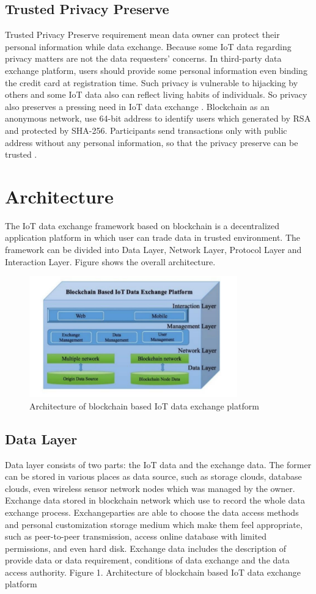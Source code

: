 \section{Trusted Privacy Preserve}
Trusted Privacy Preserve requirement mean data owner
can protect their personal information while data exchange.
Because some IoT data regarding privacy matters are not the
data requesters’ concerns.
In third-party data exchange platform, users should
provide some personal information even binding the credit
card at registration time. Such privacy is vulnerable to
hijacking by others and some IoT data also can reflect living
habits of individuals. So privacy also preserves a pressing
need in IoT data exchange .
Blockchain as an anonymous network, use 64-bit address
to identify users which generated by RSA and protected by
SHA-256. Participants send transactions only with public
address without any personal information, so that the privacy
preserve can be trusted .


\chapter{ Architecture}

The IoT data exchange framework based on blockchain
is a decentralized application platform in which user can
trade data in trusted environment. The framework can be
divided into Data Layer, Network Layer, Protocol Layer and
Interaction Layer. Figure shows the overall architecture.
\begin{figure}[h]
	\centering
	\includegraphics[width=9cm]{./architecture}
	\caption{Architecture of blockchain based IoT data exchange platform}
\end{figure}
\section{Data Layer}
Data layer consists of two parts: the IoT data and the
exchange data. The former can be stored in various places as
data source, such as storage clouds, database clouds, even
wireless sensor network nodes which was managed by the
owner. Exchange data stored in blockchain network which
use to record the whole data exchange process. Exchangeparties are able to choose the data access methods and
personal customization storage medium which make them
feel appropriate, such as peer-to-peer transmission, access
online database with limited permissions, and even hard disk.
Exchange data includes the description of provide data or
data requirement, conditions of data exchange and the data
access authority.
Figure 1. Architecture of blockchain based IoT data exchange platform
